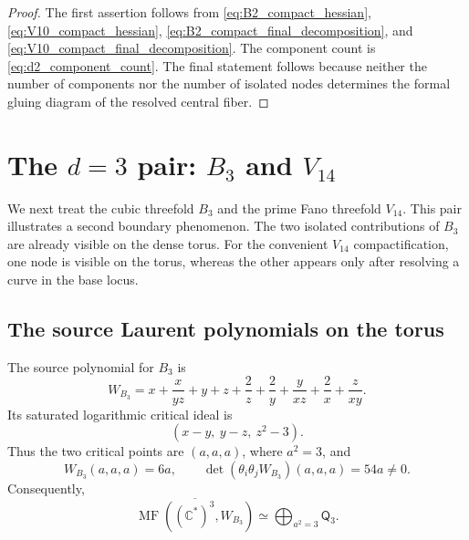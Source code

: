 \documentclass[11pt]{amsart}
\theoremstyle{definition}
\theoremstyle{remark}
\DeclareMathOperator{\MF}{MF}
\newcommand{\MorseCat}[1]{\mathsf{Q}_{#1}}
\begin{document}
\begin{proof}
The first assertion follows from
\eqref{eq:B2_compact_hessian},
\eqref{eq:V10_compact_hessian},
\eqref{eq:B2_compact_final_decomposition}, and
\eqref{eq:V10_compact_final_decomposition}.  The component count is
\eqref{eq:d2_component_count}.  The final statement follows because neither
the number of components nor the number of isolated nodes determines the
formal gluing diagram of the resolved central fiber.
\end{proof}

\section{The \texorpdfstring{$d=3$}{d=3} pair: \texorpdfstring{$B_3$ and $V_{14}$}{B3 and V14}}
\label{sec:B3_V14_calculation}

We next treat the cubic threefold $B_3$ and the prime Fano threefold
$V_{14}$.  This pair illustrates a second boundary phenomenon.  The two
isolated contributions of $B_3$ are already visible on the dense torus.  For
the convenient $V_{14}$ compactification, one node is visible on the torus,
whereas the other appears only after resolving a curve in the base locus.

\subsection{The source Laurent polynomials on the torus}

The source polynomial for $B_3$ is
\begin{equation}
\label{eq:B3_source_polynomial}
W_{B_3}
=x+\frac{x}{yz}+y+z+\frac2z+\frac2y
+\frac{y}{xz}+\frac2x+\frac{z}{xy}.
\end{equation}
Its saturated logarithmic critical ideal is
\[
(x-y,\ y-z,\ z^2-3).
\]
Thus the two critical points are $(a,a,a)$, where $a^2=3$, and
\[
W_{B_3}(a,a,a)=6a,
\qquad
\det(\theta_i\theta_jW_{B_3})(a,a,a)=54a\neq0.
\]
Consequently,
\begin{equation}
\label{eq:B3_source_category}
\overline{\MF((\mathbb C^*)^3,W_{B_3})}
\simeq
\bigoplus_{a^2=3}\MorseCat{3}.
\end{equation}
\end{document}
